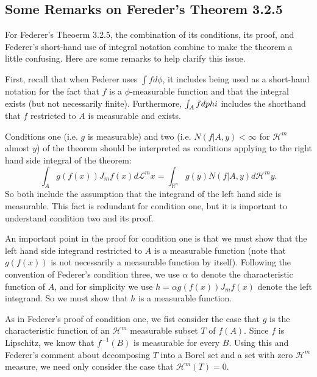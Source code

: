 \subsection{Some Remarks on Fereder's Theorem 3.2.5}
For Federer's Theoerm 3.2.5, the combination of its conditions, its proof, and Federer's short-hand use of integral notation combine to make the theorem a little confusing. Here are some remarks
to help clarify this issue.

First, recall that when Federer uses \(\int f d\phi\), it includes being used as a short-hand notation for the fact that \(f\) is a \(\phi\)-measurable function and that the integral exists
(but not necessarily finite). Furthermore, \(\int_A f d\\phi\)
includes the shorthand that \(f\) restricted to \(A\) is measurable and exists.

Conditions one (i.e. \(g\) is measurable) and two (i.e. \(N(f|A, y) < \infty\) for \(\mathcal H^m\) almost \(y\)) of the theorem should be interpreted as conditions applying to the right hand side
integral of the theorem:
\begin{equation}
\int_A g\left(f(x)\right) J_m f(x) d \mathcal L^mx = \int_{\mathbb R^n} g(y) N(f|A, y) d \mathcal H^m y.
\end{equation}
So both include the assumption that the integrand of the left hand side is measurable. This fact is redundant for condition one, but it is important to understand condition two and its proof. 

An important  point in the proof for condition one is that we must show that the left hand side integrand restricted to \(A\) is a measurable function (note that \(g(f(x))\) is not necessarily
a measurable function by itself). Following the convention of Federer's condition three,
we use \(\alpha\) to denote the characteristic function of \(A\), and for simplicity we use \(h = \alpha g\left(f(x)\right) J_m f(x)\) denote the left integrand. So we must show that \(h\) is
a measurable function. 

As in Federer's proof of condition one, we fist consider the case that \(g\) is the characteristic function of an \(\mathcal H^m\) measurable subset \(T\) of \(f(A)\). Since \(f\) is
Lipschitz, we know that \(f^{-1}(B)\) is measurable for every \(B\). Using this and Federer's comment about decomposing \(T\) into a Borel set and a set with zero \(\mathcal H^m\) measure,
we need only consider the case that \(\mathcal H^m(T) = 0\). 

